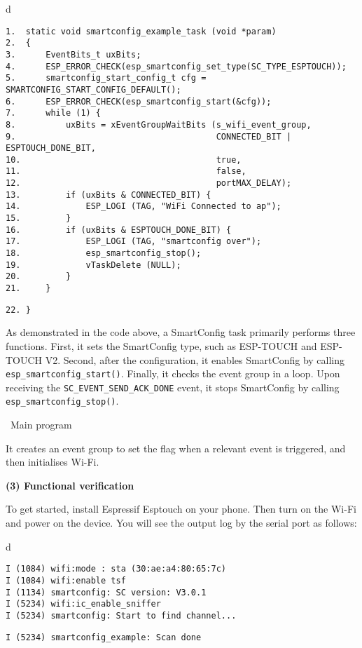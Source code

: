 \documentclass[a4paper,12pt]{book}
\begin{document}
\begin{codebloc}
\begin{tabular}{d}
\vspace{2pt}
\begin{verbatim}
1.  static void smartconfig_example_task (void *param)
2.  {
3.      EventBits_t uxBits;
4.      ESP_ERROR_CHECK(esp_smartconfig_set_type(SC_TYPE_ESPTOUCH));
5.      smartconfig_start_config_t cfg = SMARTCONFIG_START_CONFIG_DEFAULT();
6.      ESP_ERROR_CHECK(esp_smartconfig_start(&cfg));
7.      while (1) {
8.          uxBits = xEventGroupWaitBits (s_wifi_event_group,
9.                                        CONNECTED_BIT | ESPTOUCH_DONE_BIT,
10.                                       true,
11.                                       false,
12.                                       portMAX_DELAY);
13.         if (uxBits & CONNECTED_BIT) {
14.             ESP_LOGI (TAG, "WiFi Connected to ap");
15.         }
16.         if (uxBits & ESPTOUCH_DONE_BIT) {
17.             ESP_LOGI (TAG, "smartconfig over");
18.             esp_smartconfig_stop();
19.             vTaskDelete (NULL);
20.         }
21.     }
\end{verbatim}
\verb|22. }|
\end{tabular}
\end{codebloc}

As demonstrated in the code above, a SmartConfig task primarily performs three functions. First, it sets the SmartConfig type, such as ESP-TOUCH and ESP-TOUCH V2. Second, after the configuration, it enables SmartConfig by calling \verb|esp_smartconfig_start()|. Finally, it checks the event group in a loop. Upon receiving the \verb|SC_EVENT_SEND_ACK_DONE| event, it stops SmartConfig by calling \verb|esp_smartconfig_stop()|.

\textbullet\ Main program

It creates an event group to set the flag when a relevant event is triggered, and then initialises Wi-Fi.

\textbf{(3) Functional verification}

To get started, install Espressif Esptouch on your phone. Then turn on the Wi-Fi and power on the device. You will see the output log by the serial port as follows:

\begin{codebloc}
\begin{tabular}{d}
\vspace{2pt}
\begin{verbatim}
I (1084) wifi:mode : sta (30:ae:a4:80:65:7c)
I (1084) wifi:enable tsf
I (1134) smartconfig: SC version: V3.0.1
I (5234) wifi:ic_enable_sniffer
I (5234) smartconfig: Start to find channel...
\end{verbatim}
\verb|I (5234) smartconfig_example: Scan done|
\end{tabular}
\end{codebloc}
\end{document}
